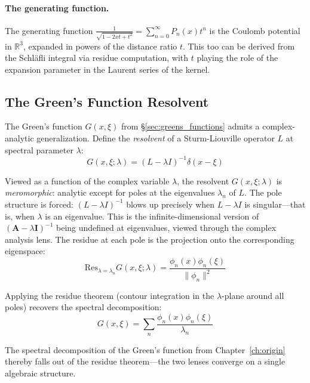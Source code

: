 \documentclass[12pt,a4paper]{report}
\theoremstyle{thms}
\theoremstyle{defns}
\begin{document}
\paragraph{The generating function.} The generating function $\frac{1}{\sqrt{1 - 2xt + t^2}} = \sum_{n=0}^{\infty} P_n(x) t^n$ is the Coulomb potential in $\mathbb{R}^3$, expanded in powers of the distance ratio $t$. This too can be derived from the Schl\"{a}fli integral via residue computation, with $t$ playing the role of the expansion parameter in the Laurent series of the kernel.

\subsection{The Green's Function Resolvent}

The Green's function $G(x, \xi)$ from \S\ref{sec:greens_functions} admits a complex-analytic generalization. Define the \textit{resolvent} of a Sturm-Liouville operator $L$ at spectral parameter $\lambda$:
\begin{equation}
    G(x, \xi; \lambda) = (L - \lambda I)^{-1}\delta(x - \xi)
\end{equation}

Viewed as a function of the complex variable $\lambda$, the resolvent $G(x, \xi; \lambda)$ is \textit{meromorphic}: analytic except for poles at the eigenvalues $\lambda_n$ of $L$. The pole structure is forced: $(L - \lambda I)^{-1}$ blows up precisely when $L - \lambda I$ is singular—that is, when $\lambda$ is an eigenvalue. This is the infinite-dimensional version of $(\mathbf{A} - \lambda \mathbf{I})^{-1}$ being undefined at eigenvalues, viewed through the complex analysis lens. The residue at each pole is the projection onto the corresponding eigenspace:
\begin{equation}
    \mathrm{Res}_{\lambda = \lambda_n} G(x, \xi; \lambda) = \dfrac{\phi_n(x)\phi_n(\xi)}{\|\phi_n\|^2}
\end{equation}

Applying the residue theorem (contour integration in the $\lambda$-plane around all poles) recovers the spectral decomposition:
\begin{equation}
    G(x, \xi) = \sum_n \dfrac{\phi_n(x)\phi_n(\xi)}{\lambda_n}
\end{equation}

The spectral decomposition of the Green's function from Chapter~\ref{ch:origin} thereby falls out of the residue theorem—the two lenses converge on a single algebraic structure.
\end{document}
